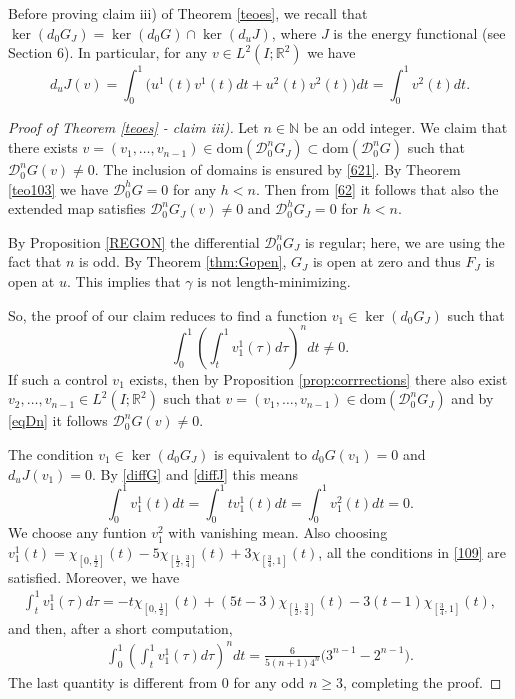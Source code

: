 \documentclass[12pt, reqno]{amsart}
\theoremstyle{plain}
\theoremstyle{definition}
\theoremstyle{remark}
\numberwithin{equation}{section}
\newcommand{\R}{\mathbb{R}}
\newcommand{\N}{\mathbb{N}}
\newcommand{\D}{\mathcal{D}}
\newcommand{\0}{\theta}
\newcommand{\g}{\gamma}
\newcommand{\1}{{-1}}
\newcommand{\m}{n}
\renewcommand{\=}{\coloneqq}
\renewcommand{\.}{\dots}
\newcommand{\dom}{\mathrm{dom}}
\newcommand{\be}{\begin{equation}}
\newcommand{\ee}{\end{equation}}
\newcommand{\chia}{\chi_{\left[0,\frac{1}{2}\right]}}
\newcommand{\chib}{\chi_{\left[\frac{1}{2},\frac{3}{4}\right]}}
\newcommand{\chic}{\chi_{\left[\frac{3}{4},1\right]}}
\begin{document}
Before proving claim iii) of Theorem \ref{teoes}, we recall that $\ker(d_0G_J)=\ker(d_0G)\cap\ker(d_uJ)$, where $J$ is the energy functional (see Section 6). In particular, for any $v\in L^2(I;\R^2)$ we have
\be
 \label{diffJ}
d_uJ(v)=
 \int_0^1\big(u^1(t)v^1(t)dt+
   u^2(t)v^2(t)\big)dt
 =\int_0^1v^2(t)dt.
\ee




\begin{proof}[Proof of Theorem \ref{teoes} - claim iii)]
Let $\m\in\N$ be an odd integer. We claim that there exists  $v=(v_1,\.,v_{n-1})\in\dom(\D_0^nG_J)   \subset \dom(\D_0^nG)$ such that $\D_0^nG(v)\neq0$. The inclusion of domains is ensured by \eqref{621}.
By Theorem \ref{teo103} we have $\D_0^hG=0$ for any $h<\m$. Then from \eqref{62} it follows that also the extended map
satisfies   $\D_0^nG_J(v)\neq0$  and 
 $\D_0^hG_J=0$
 for $h<\m$.
 
 By  Proposition \ref{REGON}
  the differential $\D_0^nG_J$ is regular; here, we are using the fact that $n$ is odd. 
By Theorem \ref{thm:Gopen},   $G_J$ is open at zero and thus  $F_J$ is open at $u$.
This implies that $\g$ is not length-minimizing.

So, the proof of our claim reduces to find a function $v_1\in\ker(d_0G_J)$ such that 
\be
 \label{108}
 \int_0^1\left(\int_t^1 v_1^1(\tau)d\tau\right)^n dt\neq0.
\ee
If such a control $v_1$ exists, then by Proposition \ref{prop:corrrections} there also exist  $v_2,\.,v_{n-1}\in L^2(I;\R^2)$ such that $v=(v_1,\.,v_{n-1})\in\dom(\D_0^nG_J)$ and by \eqref{eqDn} it follows $\D_0^nG(v)\neq0$.



The condition $v_1\in\ker(d_0G_J)$ is equivalent to $d_0G(v_1)=0$ and $d_uJ(v_1)=0$. By \eqref{diffG} and \eqref{diffJ} this means
\be
 \label{109}
 \int_0^1 v_1^1(t)dt=\int_0^1 tv_1^1(t)dt=\int_0^1v_1^2(t)dt=0.
\ee
We choose any funtion $v_1^2$ with vanishing mean.
Also choosing $v_1^1(t)=\chia(t)-5\chib(t)+3\chic(t)$, all the conditions in \eqref{109} are satisfied. Moreover, we have
\begin{align*}
 \int_t^1 v_1^1(\tau)d\tau=-t\chia(t) + (5t-3)\chib(t) - 3(t-1)\chic(t),
\end{align*}
and then, after a short computation,
\begin{align*}
 \int_0^1\left(\int_t^1 v_1^1(\tau)d\tau\right)^n dt=\frac{6}{5(n+1)4^{n}}\big(3^{n-1} - 2^{n-1}\big).
\end{align*}
The last quantity is different from 0 for any odd $n\geq3$, completing the proof.

 \end{proof}
 
\end{document}
